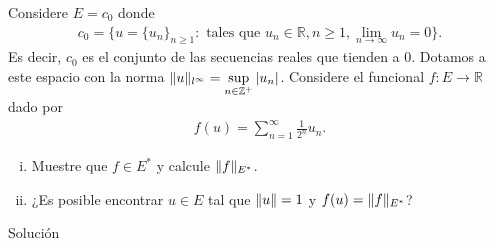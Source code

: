 \begin{homeworkProblem}
  Considere $E=c_0$ donde
  \begin{align*}
    c_0=\{u=\{u_n\}_{n\geq 1}: \text{ tales que }u_{n}\in\mathbb{R},n\geq 1,\lim_{n \to \infty}u_{n}=0\}.
  \end{align*}
  Es decir, $c_0$ es el conjunto de las secuencias reales que tienden a $0$. Dotamos a este espacio con la norma $\lVert u\rVert_{l^{\infty}}=\displaystyle \sup_{n\in\mathbb{Z}^{+}}|u_{n}|$. Considere el funcional $f:E\to \mathbb{R}$ dado por
  \begin{align*}
    f(u)=\sum_{n=1}^{\infty}\frac{1}{2^{n}}u_{n}.
  \end{align*}
  \begin{enumerate}[(i)]
    \item Muestre que $f\in E^{*}$ y calcule $\lVert f\rVert_{E^{*}}$.
    \item ¿Es posible encontrar $u\in E$ tal que $\lVert u\rVert=1$ y $f(u)=\lVert f\rVert_{E^{*}}$? 
  \end{enumerate}
  \begin{solution}
    Solución
  \end{solution}
\end{homeworkProblem}
